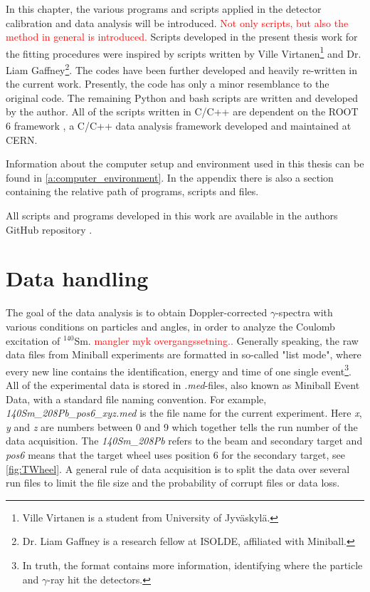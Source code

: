 \documentclass[twoside,english]{uiofysmaster/uiofysmaster}
\newcommand{\Sm}{$^{140}$Sm} %
\newcommand{\ga}{$\gamma$}
\let\orgautoref\autoref
\renewcommand{\autoref}
        {%
		 \def\sectionautorefname{Section}%
		 \def\subsectionautorefname{Section}%
		 \def\subsubsectionautorefname{Section}%
		 \def\chapterautorefname{Chapter}%
          \orgautoref}
\begin{document}
In this chapter, the various programs and scripts applied in the detector calibration and data analysis will be introduced. 
\textcolor{red}{Not only scripts, but also the method in general is introduced.}
Scripts developed in the present thesis work for the fitting procedures were inspired by scripts written by Ville Virtanen\footnote{Ville Virtanen is a student from University of Jyväskylä.} and Dr. Liam Gaffney\footnote{Dr. Liam Gaffney is a research fellow at ISOLDE, affiliated with Miniball.}. 
The codes have been further developed and heavily re-written in the current work. 
Presently, the code has only a minor resemblance to the original code. 
The remaining Python and bash scripts are written and developed by the author.
All of the scripts written in C/C++ are dependent on the ROOT 6 framework \cite{ROOT}, a C/C++ data analysis framework developed and maintained at CERN.

Information about the computer setup and environment used in this thesis can be found in \autoref{a:computer_environment}. In the appendix there is also a section containing the relative path of programs, scripts and files.

All scripts and programs developed in this work are available in the authors GitHub repository \cite{GH-repo}.


\section{Data handling}
The goal of the data analysis is to obtain Doppler-corrected \ga-spectra with various conditions on particles and angles, in order to analyze the Coulomb excitation of \Sm. 
\textcolor{red}{mangler myk overgangssetning..}
Generally speaking, the raw data files from Miniball experiments are formatted in so-called "list mode", where every new line contains the identification, energy and time of one single event\footnote{In truth, the format contains more information, identifying where the particle and \ga-ray hit the detectors.}.
All of the experimental data is stored in \textit{.med}-files, also known as Miniball Event Data, with a standard file naming convention. 
For example, \textit{140Sm\_208Pb\_pos6\_xyz.med} is the file name for the current experiment. 
Here \textit{x}, \textit{y} and \textit{z} are numbers between 0 and 9 which together tells the run number of the data acquisition. 
The \textit{140Sm\_208Pb} refers to the beam and secondary target and \textit{pos6} means that the target wheel uses position 6 for the secondary target, see \autoref{fig:TWheel}.
A general rule of data acquisition is to split the data over several run files to limit the file size and the probability of corrupt files or data loss.
\end{document}
